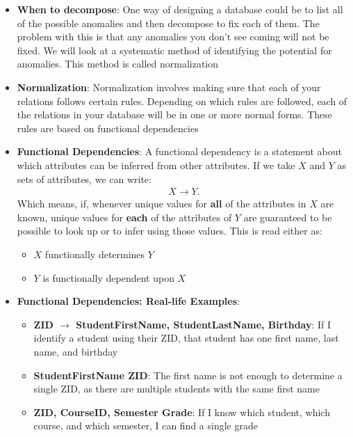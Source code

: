 \documentclass{report}
\begin{document}
\begin{itemize}
\begin{center}
            \end{center}
        \item \textbf{When to decompose}: One way of designing a database could be to list all of the possible anomalies and then decompose to fix each of them. The problem with this is that any anomalies you don't see coming will not be fixed.
            \bigbreak \noindent 
            We will look at a systematic method of identifying the potential for anomalies. This method is called normalization
        \item \textbf{Normalization}: Normalization involves making sure that each of your relations follows certain rules. Depending on which rules are followed, each of the relations in your database will be in one or more normal forms. These rules are based on functional dependencies
        \item \textbf{Functional Dependencies}: A functional dependency is a statement about which attributes can be inferred from other attributes. If we take $X$ and $Y$ as sets of attributes, we can write:
            \begin{align*}
                X \to Y
            .\end{align*}
            \bigbreak \noindent 
            Which means, if, whenever unique values for \textbf{all} of the attributes in $X$ are known, unique values for \textbf{each} of the attributes of $Y$ are guaranteed to be possible to look up or to infer using those values.
            \bigbreak \noindent 
            This is read either as:
            \begin{itemize}
                \item $X$ functionally determines $Y$
                \item $Y$ is functionally dependent upon $X$
            \end{itemize}
        \item \textbf{Functional Dependencies: Real-life Examples}: 
            \begin{itemize}
                \item \textbf{ZID $\to$ StudentFirstName, StudentLastName, Birthday}: If I identify a student using their ZID, that student has one first name, last name, and birthday
                \item \textbf{StudentFirstName \not \to ZID}: The first name is not enough to determine a single ZID, as there are multiple students with the same first name
                \item \textbf{ZID, CourseID, Semester \to Grade}: If I know which student, which course, and which semester, I can find a single grade

\end{itemize}
\end{itemize}
\end{document}
